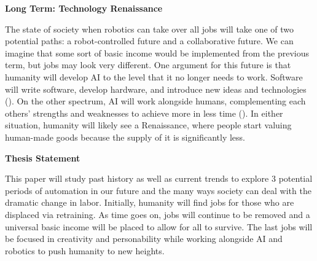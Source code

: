 \documentclass[12pt,letterpaper,man,natbib]{apa6}
\begin{document}
    \textbf{Long Term: Technology Renaissance}
    
    The state of society when robotics can take over all jobs will take one of two potential paths: a robot-controlled future and a collaborative future. We can imagine that some sort of basic income would be implemented from the previous term, but jobs may look very different. One argument for this future is that humanity will develop AI to the level that it no longer needs to work. Software will write software, develop hardware, and introduce new ideas and technologies (\cite{FutureOfAI}). On the other spectrum, AI will work alongside humans, complementing each others' strengths and weaknesses to achieve more in less time (\cite{AI_Humans_Future}). In either situation, humanity will likely see a Renaissance, where people start valuing human-made goods because the supply of it is significantly less.

    \textbf{Thesis Statement}

    This paper will study past history as well as current trends to explore 3 potential periods of automation in our future and the many ways society can deal with the dramatic change in labor. Initially, humanity will find jobs for those who are displaced via retraining. As time goes on, jobs will continue to be removed and a universal basic income will be placed to allow for all to survive. The last jobs will be focused in creativity and personability while working alongside AI and robotics to push humanity to new heights.
\end{document}
